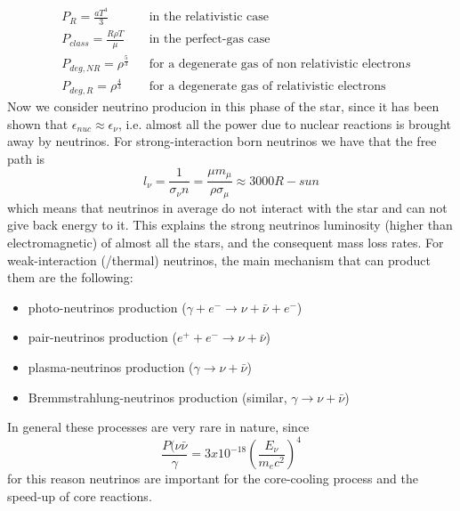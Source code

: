 \documentclass[main.tex]{subfiles}
\begin{document}
\begin{align}
&P_R=\frac{aT^4}{3} && \text{in the relativistic case}\\
&P_{class}=\frac{R\rho T}{\mu} && \text{in the perfect-gas case}\\
&P_{deg,NR}=\rho^{\frac{5}{3}} && \text{for a degenerate gas of non relativistic electron}s\\
&P_{deg,R}=\rho^{\frac{4}{3}} && \text{for a degenerate gas of relativistic electrons}
\end{align}
Now we consider neutrino producion in this phase of the star, since it has been shown that $\epsilon_{nuc}\approx\epsilon_\nu$, i.e. almost all the power due to nuclear reactions is brought away by neutrinos. For strong-interaction born neutrinos we have that the free path is
\begin{equation}
    l_\nu=\frac{1}{\sigma_\nu n}=\frac{\mu m_\mu}{\rho\sigma_\mu}\approx 3000 R-sun
\end{equation}
which means that neutrinos in average do not interact with the star and can not give back energy to it. This explains the strong neutrinos luminosity (higher than electromagnetic) of almost all the stars, and the consequent mass loss rates.
For weak-interaction (/thermal) neutrinos, the main mechanism that can product them are the following:
\begin{itemize}
    \item photo-neutrinos production ($\gamma+e^- \to \nu + \bar\nu +e^-$)
    \item pair-neutrinos production ($e^++e^- \to \nu + \bar\nu $)
    \item plasma-neutrinos production ($\gamma \to \nu + \bar\nu $)
    \item Bremmstrahlung-neutrinos production (similar, $\gamma \to \nu + \bar\nu $)
\end{itemize}
In general these processes are very rare in nature, since
\begin{equation}
    \frac{P(\nu\bar\nu}{\gamma}=3x10^{-18}\left(\frac{E_\nu}{m_e c^2}\right)^4
\end{equation}
for this reason neutrinos are important for the core-cooling process and the speed-up of core reactions.
\end{document}
